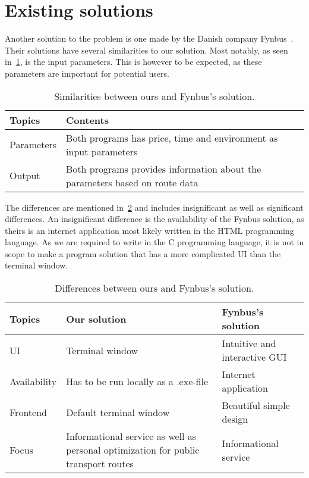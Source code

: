 \section{Existing solutions}\label{existing-solutions}

Another solution to the problem is one made by the Danish company Fynbus~\cite{fynbus2023}.
Their solutions have several similarities to our solution.
Most notably, as seen in~\ref{tab:similarities-between-ours-and-fynbus's-solution}, is the input parameters.
This is however to be expected, as these parameters are important for potential users.

\begin{table}[ht]
    \centering
    \begin{tabular}{|l|p{5cm}|p{5cm}|}
        \hline
        \textbf{Topics} & \textbf{Contents} \\
        \hline
        Parameters & Both programs has price, time and environment as input parameters \\
        \hline
        Output & Both programs provides information about the parameters based on route data \\
        \hline
    \end{tabular}
    \caption{Similarities between ours and Fynbus's solution.}
    \label{tab:similarities-between-ours-and-fynbus's-solution}
\end{table}

The differences are mentioned in~\ref{tab:differences-between-ours-and-fynbus's-solution} and includes insignificant as
well as significant differences.
An insignificant difference is the availability of the Fynbus solution, as theirs is an internet application most
likely written in the HTML programming language.
As we are required to write in the C programming language, it is not in scope to make a program solution that has a more
complicated UI than the terminal window.

\begin{table}[ht]
    \centering
    \begin{tabular}{|l|p{5cm}|p{5cm}|}
        \hline
        \textbf{Topics} & \textbf{Our solution} & \textbf{Fynbus's solution} \\
        \hline
        UI & Terminal window & Intuitive and interactive GUI \\
        \hline
        Availability & Has to be run locally as a .exe-file & Internet application \\
        \hline
        Frontend & Default terminal window & Beautiful simple design \\
        \hline
        Focus & Informational service as well as personal optimization for public transport routes & Informational service \\
        \hline
    \end{tabular}
    \caption{Differences between ours and Fynbus's solution.}
    \label{tab:differences-between-ours-and-fynbus's-solution}
\end{table}

